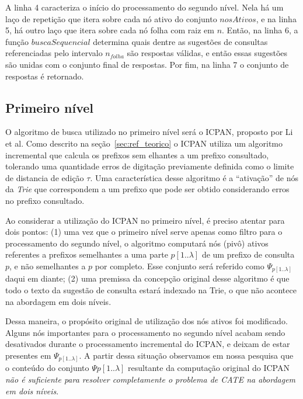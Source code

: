 A linha 4 caracteriza o início do processamento do segundo nível. Nela há um laço de repetição que itera sobre cada nó ativo do conjunto $nosAtivos$, e na linha 5, há outro laço que itera sobre cada nó folha com raiz em $n$. Então, na linha 6, a função $buscaSequencial$ determina quais dentre as sugestões de consultas referenciadas pelo intervalo $n_{folha}$ são respostas válidas, e então essas sugestões são unidas com o conjunto final de respostas. Por fim, na linha 7 o conjunto de respostas é retornado.



\subsection{Primeiro nível}
\label{sec:first-level}

O algoritmo de busca utilizado no primeiro nível será o ICPAN, proposto por Li et al. Como descrito na seção~\ref{sec:ref_teorico} o ICPAN utiliza um algoritmo incremental que calcula os prefixos sem elhantes a um prefixo consultado, tolerando uma quantidade erros de digitação previamente definida como o limite de distancia de edição $\tau$. Uma característica desse algoritmo é a ``ativação'' de nós da \textit{Trie} que correspondem a um prefixo que pode ser obtido considerando erros no prefixo consultado.

Ao considerar a utilização do ICPAN no primeiro nível, é preciso atentar para dois pontos: (1) uma vez que o primeiro nível serve apenas como filtro para o processamento do segundo nível, o algoritmo computará nós (pivô) ativos referentes a prefixos semelhantes a uma parte $p[1..\lambda]$ de um prefixo de consulta $p$, e não semelhantes a $p$ por completo. Esse conjunto será referido como $\Psi_{p[1..\lambda]}$ daqui em diante; (2) uma premissa da concepção original desse algoritmo é que todo o texto da sugestão de consulta estará indexado na Trie, o que não acontece na abordagem em dois níveis.

Dessa maneira, o propósito original de utilização dos nós ativos foi modificado. Alguns nós importantes para o processamento no segundo nível acabam sendo desativados durante o processamento incremental do ICPAN, e deixam de estar presentes em $\Psi_{p[1..\lambda]}$. A partir dessa situação observamos em nossa pesquisa que o conteúdo do conjunto $\Psi{p[1..\lambda]}$ resultante da computação original do ICPAN \textit{não é suficiente para resolver completamente o problema de CATE na abordagem em dois níveis}. 

